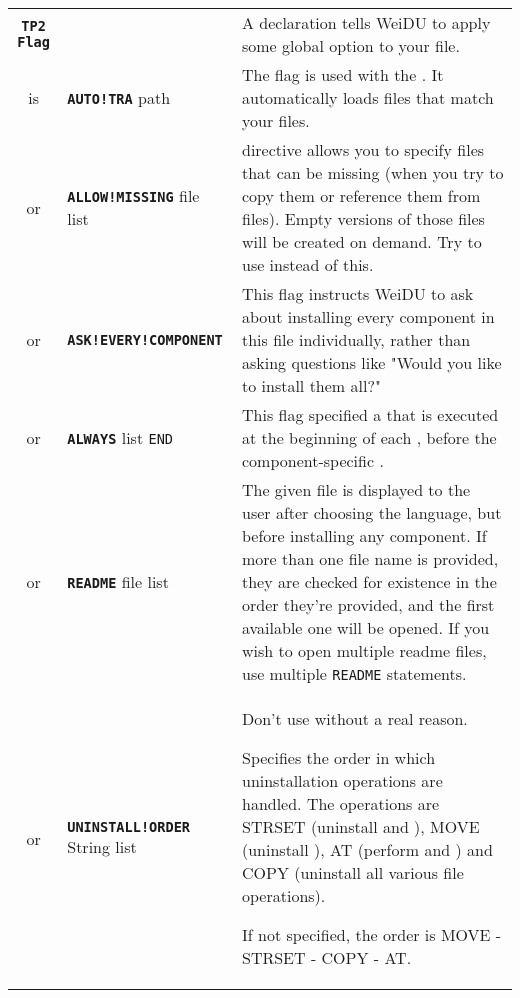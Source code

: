 \documentclass{article}
\def\ttref#1{\ahrefloc{#1}{\tt #1}}
\def\DEFINE#1{{\tt \bf #1}\label{#1}\index{#1}}
\def\DEFSYN#1{{\tt \bf #1}\index{#1}}
\def\t#1{{\tt #1}}
\def\Slist{{\color{red} list }}
\begin{document}
\begin{tabular}{cp{10in}|p{10in}}
\DEFINE{TP2 Flag} & & A \ttref{TP2 Flag} declaration tells WeiDU to apply some
global option to your \ttref{TP2} file. \\
  is & \DEFINE{AUTO!TRA} path &
       The \ttref{AUTO!TRA} flag is used
       with the \ttref{COMPILE} \ttref{TP2 Action}. It automatically loads
       \ttref{TRA} files that match your \ttref{D} files.  \\
  or & \DEFINE{ALLOW!MISSING} file \Slist &
       \ttref{ALLOW!MISSING} directive allows you to specify files that can
       be missing (when you try to copy them or reference them from
       \ttref{D} files). Empty versions of those files will be created on
       demand. Try to use \ttref{ACTION!IF} instead of this. \\
  or & \DEFINE{ASK!EVERY!COMPONENT} &
       This flag instructs WeiDU to ask about installing every component in
       this \ttref{TP2} file individually, rather than asking questions
       like "Would you like to install them all?" \\
  or & \DEFINE{ALWAYS} \ttref{TP2 Action} \Slist \t{END} &
       This flag specified a \ttref{TP2 Action} that is executed at the beginning
       of each \ttref{Component}, before the component-specific \ttref{TP2 Action}.  \\
  or & \DEFINE{README} file \Slist &
       The given file is displayed to the user after choosing the language, but
       before installing any component. If more than one file name is provided,
       they are checked for existence in the order they're provided, and the first available
       one will be opened. If you wish to open multiple readme files, use multiple \t{README}
       statements.
  \\
  or & \DEFSYN{UNINSTALL!ORDER} String \Slist &
		Don't use without a real reason.

		Specifies the order in which uninstallation operations are handled.
		The operations are STRSET (uninstall \ttref{STRING!SET} and
                \ttref{ALTER!TLK}), MOVE
		(uninstall \ttref{MOVE}), AT (perform \ttref{AT!UNINSTALL} and
                \ttref{AT!INTERACTIVE!UNINSTALL}) and
		COPY (uninstall all various file operations).

		If not specified, the order is MOVE - STRSET - COPY - AT.


\end{tabular}
\end{document}
